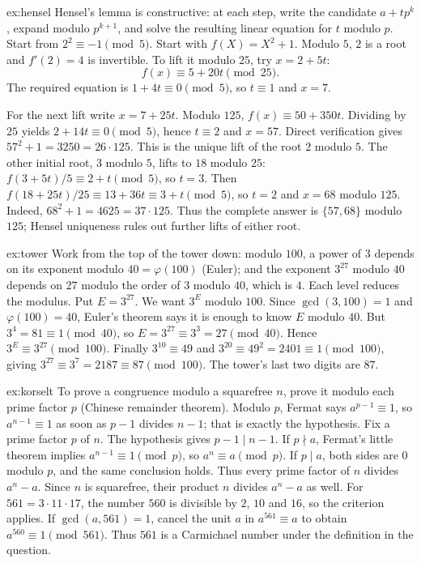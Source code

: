 \begin{solution}{ex:hensel}
\idea Hensel's lemma is constructive: at each step, write the candidate $a+tp^k$, expand modulo $p^{k+1}$, and solve the resulting linear equation for $t$ modulo $p$. Start from $2^2\equiv-1\pmod5$.
\writeup Start with $f(X)=X^2+1$. Modulo $5$, $2$ is a root and $f'(2)=4$ is invertible. To lift it modulo $25$, try $x=2+5t$:
\[
f(x)\equiv5+20t\pmod{25}.
\]
The required equation is $1+4t\equiv0\pmod5$, so $t\equiv1$ and $x=7$.

For the next lift write $x=7+25t$. Modulo $125$,
$f(x)\equiv50+350t$. Dividing by $25$ yields $2+14t\equiv0\pmod5$, hence $t\equiv2$ and $x=57$. Direct verification gives $57^2+1=3250=26\cdot125$. This is the unique lift of the root $2$ modulo $5$.
The other initial root, $3$ modulo $5$, lifts to $18$ modulo $25$:
$f(3+5t)/5\equiv2+t\pmod5$, so $t=3$.
Then $f(18+25t)/25\equiv13+36t\equiv3+t\pmod5$,
so $t=2$ and $x=68$ modulo $125$.
Indeed, $68^2+1=4625=37\cdot125$.
Thus the complete answer is $\{57,68\}$ modulo $125$;
Hensel uniqueness rules out further lifts of either root.
\end{solution}

\begin{solution}{ex:tower}
\idea Work from the top of the tower down: modulo $100$, a power of $3$ depends on its exponent modulo $40=\varphi(100)$ (Euler); and the exponent $3^{27}$ modulo $40$ depends on $27$ modulo the order of $3$ modulo $40$, which is $4$. Each level reduces the modulus.
\writeup Put $E=3^{27}$. We want $3^E$ modulo $100$. Since $\gcd(3,100)=1$ and $\varphi(100)=40$, Euler's theorem says it is enough to know $E$ modulo $40$. But $3^4=81\equiv1\pmod{40}$, so $E=3^{27}\equiv3^3=27\pmod{40}$. Hence $3^E\equiv3^{27}\pmod{100}$. Finally $3^{10}\equiv49$ and $3^{20}\equiv49^2=2401\equiv1\pmod{100}$, giving $3^{27}\equiv3^7=2187\equiv87\pmod{100}$. The tower's last two digits are $87$.
\end{solution}

\begin{solution}{ex:korselt}
\idea To prove a congruence modulo a squarefree $n$, prove it modulo each prime factor $p$ (Chinese remainder theorem). Modulo $p$, Fermat says $a^{p-1}\equiv1$, so $a^{n-1}\equiv1$ as soon as $p-1$ divides $n-1$; that is exactly the hypothesis.
\writeup Fix a prime factor $p$ of $n$. The hypothesis gives $p-1\mid n-1$. If $p\nmid a$, Fermat's little theorem implies $a^{n-1}\equiv1\pmod p$, so $a^n\equiv a\pmod p$. If $p\mid a$, both sides are $0$ modulo $p$, and the same conclusion holds. Thus every prime factor of $n$ divides $a^n-a$. Since $n$ is squarefree, their product $n$ divides $a^n-a$ as well. For $561=3\cdot11\cdot17$, the number $560$ is divisible by $2$, $10$ and $16$, so the criterion applies. If $\gcd(a,561)=1$, cancel the unit $a$ in $a^{561}\equiv a$ to obtain $a^{560}\equiv1\pmod{561}$. Thus $561$ is a Carmichael number under the definition in the question.
\end{solution}

